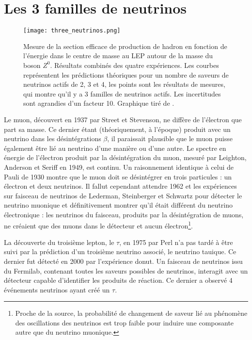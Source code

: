     \section{Les 3 familles de neutrinos}

      \begin{figure}[htpb]
        \centering
        \texttt{[image: three\_neutrinos.png]}
        \caption[Section efficace de production de hadron en fonction de l'énergie autour de la masse du boson $Z^0$]{\label{fig::three_neutrinos}Mesure de la section efficace de production de hadron en fonction de l'énergie dans le centre de masse au LEP autour de la masse du boson $Z^0$. Résultats combinés des quatre expériences. Les courbes représentent les prédictions théoriques pour un nombre de saveurs de neutrinos actifs de 2, 3 et 4, les points sont les résultats de mesures, qui montre qu'il y a 3 familles de neutrinos actifs. Les incertitudes sont agrandies d'un facteur 10. Graphique tiré de \cite{Mele2015}.}
      \end{figure}
      Le muon, découvert en 1937 par Street et Stevenson\cite{Street1937}, ne diffère de l'électron que part sa masse. Ce dernier étant (théoriquement, à l'époque) produit avec un neutrino dans les désintégrations $\beta$, il paraissait plausible que le muon puisse également être lié au neutrino d'une manière ou d'une autre.  Le spectre en énergie de l'électron produit par la désintégration du muon, mesuré par Leighton, Anderson et Seriff en 1949\cite{Leighton1949}, est continu. Un raisonnement identique à celui de Pauli de 1930 montre que le muon doit se désintégrer en trois particules : un électron et deux neutrinos. Il fallut cependant attendre 1962 et les expériences sur faisceau de neutrinos de Lederman, Steinberger et Schwartz\cite{Danby1962} pour détecter le neutrino muonique et définitivement montrer qu'il était différent du neutrino électronique : les neutrinos du faisceau, produits par la désintégration de muons, ne créaient que des muons dans le détecteur et aucun électron\footnote{Proche de la source, la probabilité  de changement de saveur lié au phénomène des oscillations des neutrinos est trop faible pour induire une composante autre que du neutrino muonique.}.

      La découverte du troisième lepton, le $\tau$, en 1975 par Perl\cite{Perl1975} n'a pas tardé à être suivi par la prédiction d'un troisième neutrino associé, le neutrino tauique. Ce dernier fut détecté en 2000 par l'expérience \gls{donut}\cite{Collaboration2000}. Un faisceau de neutrinos issu du Fermilab, contenant toutes les saveurs possibles de neutrinos, interagit avec un détecteur capable d'identifier les produits de réaction. Ce dernier a observé 4 événements neutrinos ayant créé un $\tau$.

